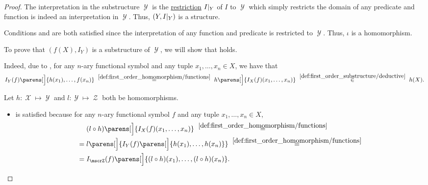 \begin{proof}
   The interpretation in the substructure \( \mscrY \) is the \hyperref[def:multi_valued_function/restriction]{restriction} \( I\vert_Y \) of \( I \) to \( \mscrY \) which simply restricts the domain of any predicate and function is indeed an interpretation in \( \mscrY \). Thus, \( (Y, I\vert_Y) \) is a structure.

  Conditions  and  are both satisfied since the interpretation of any function and predicate is restricted to \( \mscrY \). Thus, \( \iota \) is a homomorphism.

   To prove that \( (f(X), I_Y) \) is a substructure of \( \mscrY \), we will show that  holds.

  Indeed, due to , for any \( n \)-ary functional symbol and any tuple \( {x_1, \ldots, x_n \in X} \), we have that
  \begin{equation*}
    I_Y(f) \parens[\Big]{ h(x_1), \ldots, f(x_n) }
    \reloset {\ref{def:first_order_homomorphism/functions}} =
    h\parens[\Big]{ I_X(f)(x_1, \ldots, x_n) }
    \reloset {\ref{def:first_order_substructure/deductive}} \in
    h(X).
  \end{equation*}

   Let \( h: \mscrX \mapsto \mscrY \) and \( l: \mscrY \mapsto \mscrZ \) both be homomorphisms.

  \begin{itemize}
    \item {} is satisfied because for any \( n \)-ary functional symbol \( f \) and any tuple \( x_1, \ldots, x_n \in X \),
    \begin{align*}
      &\phantom{{}={}}
      (l \bincirc h) \parens[\Big]{ I_X(f)(x_1, \ldots, x_n) }
      \reloset {\ref{def:first_order_homomorphism/functions}} = \\ &=
      l\parens[\Big]{ I_Y(f) \parens[\Big]{ h(x_1), \ldots, h(x_n) } }
      \reloset {\ref{def:first_order_homomorphism/functions}} = \\ &=
      I_{\mscrZ}(f) \parens[\Big]{ (l \bincirc h)(x_1), \ldots, (l \bincirc h)(x_n) }.
    \end{align*}


\end{itemize}
\end{proof}
